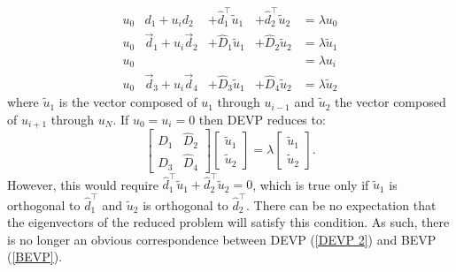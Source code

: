 \documentclass{sfuthesis}
\begin{document}
\begin{equation} \label{DEVP 2}
\begin{aligned}
u_0 & d_1 + u_i d_2 & + \hat{d}_1^\top \tilde{u}_1 & + \hat{d}_2^\top \tilde{u}_2 & = \lambda u_0 \\
u_0 & \vec{d}_1 + u_i \vec{d}_2 & + \hat{D}_1 \tilde{u}_1 & + \hat{D}_2 \tilde{u}_2 & = \lambda \tilde{u}_1 \\
u_0 & & & & = \lambda u_i \\
u_0 & \vec{d}_3 + u_i \vec{d}_4 & + \hat{D}_3 \tilde{u}_1 & + \hat{D}_4 \tilde{u}_2 & = \lambda \tilde{u}_2
\end{aligned}
\end{equation}
where $\tilde{u}_1$ is the vector composed of $u_1$ through $u_{i-1}$
and $\tilde{u}_2$ the vector composed of $u_{i+1}$ through $u_N$.
If $u_0 = u_i = 0$ then DEVP reduces to:
\begin{equation}
\begin{bmatrix} \hat{D}_1 & \hat{D}_2 \\ \hat{D}_3 & \hat{D}_4 \end{bmatrix}
\begin{bmatrix} \tilde{u}_1 \\ \tilde{u}_2 \end{bmatrix} =
\lambda \begin{bmatrix} \tilde{u}_1 \\ \tilde{u}_2 \end{bmatrix} .
\end{equation}
However, this would require $\hat{d}_1^\top \tilde{u}_1 + \hat{d}_2^\top \tilde{u}_2 = 0$,
which is true only if $\tilde{u}_1$ is orthogonal to $\hat{d}_1^\top$ and $\tilde{u}_2$ is orthogonal to $\hat{d}_2^\top$.
There can be no expectation that the eigenvectors of the reduced problem will satisfy this condition.
As such, there is no longer an obvious correspondence between DEVP (\ref{DEVP 2}) and BEVP (\ref{BEVP}).
\end{document}
